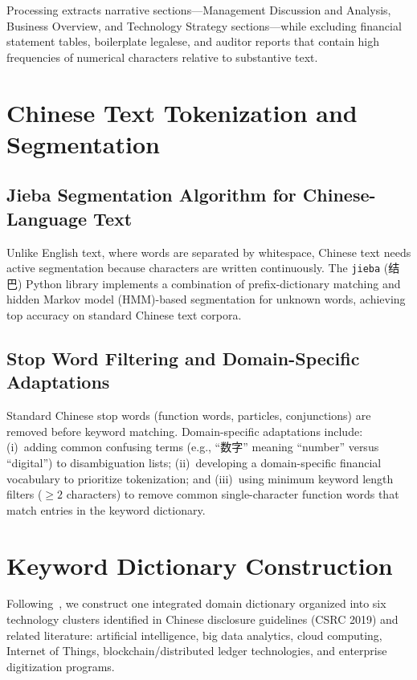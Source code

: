 Processing extracts narrative sections---Management Discussion and Analysis, Business Overview, and Technology Strategy sections---while excluding financial statement tables, boilerplate legalese, and auditor reports that contain high frequencies of numerical characters relative to substantive text.

\section{Chinese Text Tokenization and Segmentation}

\subsection{Jieba Segmentation Algorithm for Chinese-Language Text}

Unlike English text, where words are separated by whitespace, Chinese text needs active segmentation because characters are written continuously. The \texttt{jieba} (结巴) Python library implements a combination of prefix-dictionary matching and hidden Markov model (HMM)-based segmentation for unknown words, achieving top accuracy on standard Chinese text corpora.

\subsection{Stop Word Filtering and Domain-Specific Adaptations}

Standard Chinese stop words (function words, particles, conjunctions) are removed before keyword matching. Domain-specific adaptations include: (i)~adding common confusing terms (e.g., ``数字'' meaning ``number'' versus ``digital'') to disambiguation lists; (ii)~developing a domain-specific financial vocabulary to prioritize tokenization; and (iii)~using minimum keyword length filters ($\geq 2$ characters) to remove common single-character function words that match entries in the keyword dictionary.

\section{Keyword Dictionary Construction}

Following~\cite{PLi2023}, we construct one integrated domain dictionary organized into six technology clusters identified in Chinese disclosure guidelines (CSRC 2019) and related literature: artificial intelligence, big data analytics, cloud computing, Internet of Things, blockchain/distributed ledger technologies, and enterprise digitization programs.

